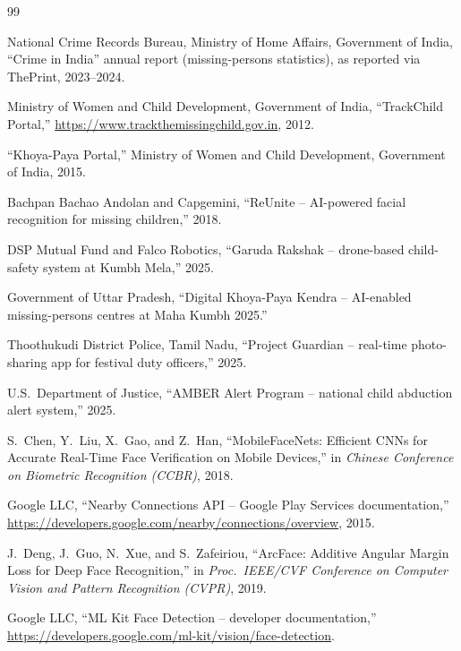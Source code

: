 \documentclass[12pt,a4paper,oneside]{report}
\begin{document}
\begin{thebibliography}{99}

National Crime Records Bureau, Ministry of Home Affairs, Government of
India, ``Crime in India'' annual report (missing-persons statistics), as
reported via ThePrint, 2023--2024.

Ministry of Women and Child Development, Government of India,
``TrackChild Portal,'' \url{https://www.trackthemissingchild.gov.in}, 2012.

``Khoya-Paya Portal,'' Ministry of Women and Child Development, Government
of India, 2015.

Bachpan Bachao Andolan and Capgemini, ``ReUnite -- AI-powered facial
recognition for missing children,'' 2018.

DSP Mutual Fund and Falco Robotics, ``Garuda Rakshak -- drone-based
child-safety system at Kumbh Mela,'' 2025.

Government of Uttar Pradesh, ``Digital Khoya-Paya Kendra -- AI-enabled
missing-persons centres at Maha Kumbh 2025.''

Thoothukudi District Police, Tamil Nadu, ``Project Guardian -- real-time
photo-sharing app for festival duty officers,'' 2025.

U.S.\ Department of Justice, ``AMBER Alert Program -- national child
abduction alert system,'' 2025.

S.~Chen, Y.~Liu, X.~Gao, and Z.~Han, ``MobileFaceNets: Efficient CNNs for
Accurate Real-Time Face Verification on Mobile Devices,'' in \emph{Chinese
Conference on Biometric Recognition (CCBR)}, 2018.

Google LLC, ``Nearby Connections API -- Google Play Services documentation,''
\url{https://developers.google.com/nearby/connections/overview}, 2015.

J.~Deng, J.~Guo, N.~Xue, and S.~Zafeiriou, ``ArcFace: Additive Angular
Margin Loss for Deep Face Recognition,'' in \emph{Proc.\ IEEE/CVF
Conference on Computer Vision and Pattern Recognition (CVPR)}, 2019.

Google LLC, ``ML Kit Face Detection -- developer documentation,''
\url{https://developers.google.com/ml-kit/vision/face-detection}.


\end{thebibliography}
\end{document}
